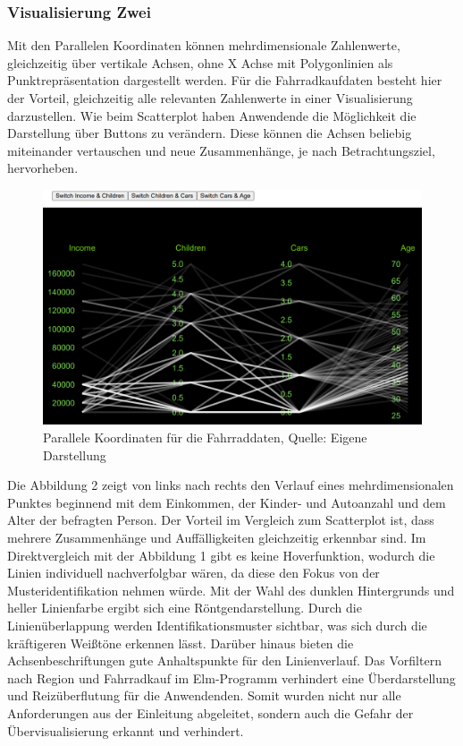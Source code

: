 \documentclass[usegeometry=true]{scrartcl}
\begin{document}
\subsubsection{Visualisierung Zwei}
Mit den Parallelen Koordinaten können mehrdimensionale Zahlenwerte, gleichzeitig über vertikale Achsen, ohne X Achse mit Polygonlinien als Punktrepräsentation dargestellt werden.
Für die Fahrradkaufdaten besteht hier der Vorteil, gleichzeitig alle relevanten Zahlenwerte in einer Visualisierung darzustellen. Wie beim Scatterplot haben Anwendende die Möglichkeit die Darstellung über Buttons zu verändern. Diese können die Achsen beliebig miteinander vertauschen und neue Zusammenhänge, je nach Betrachtungsziel, hervorheben. 
\begin{figure}[h]
\begin{center}
\includegraphics[width=16cm]{Bilder/V2ParalleleKoordinaten.png}
\caption{Parallele Koordinaten für die Fahrraddaten, Quelle: Eigene Darstellung}
\end{center}
\end{figure}
\newline Die Abbildung 2 zeigt von links nach rechts den Verlauf eines mehrdimensionalen Punktes beginnend mit dem Einkommen, der Kinder- und Autoanzahl und dem Alter der befragten Person. Der Vorteil im Vergleich zum Scatterplot ist, dass mehrere Zusammenhänge und Auffälligkeiten gleichzeitig erkennbar sind. Im Direktvergleich mit der Abbildung 1 gibt es keine Hoverfunktion, wodurch die Linien individuell nachverfolgbar wären, da diese den Fokus von der Musteridentifikation nehmen würde. Mit der Wahl des dunklen Hintergrunds und heller Linienfarbe ergibt sich eine Röntgendarstellung. Durch die Linienüberlappung werden Identifikationsmuster sichtbar, was sich durch die kräftigeren Weißtöne erkennen lässt. Darüber hinaus bieten die  Achsenbeschriftungen gute Anhaltspunkte für den Linienverlauf. Das Vorfiltern nach Region und Fahrradkauf im Elm-Programm verhindert eine Überdarstellung und Reizüberflutung für die Anwendenden. Somit wurden nicht nur alle Anforderungen aus der Einleitung abgeleitet, sondern auch die Gefahr der Übervisualisierung erkannt und verhindert.
\end{document}
